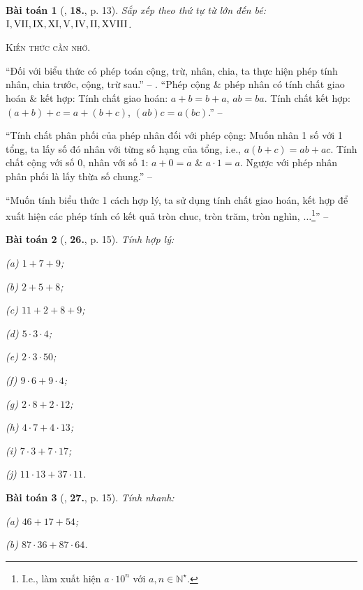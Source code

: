 \documentclass{article}
\numberwithin{equation}{section}
\newtheorem{baitoan}{Bài toán}[section]
\begin{document}
\begin{baitoan}[\cite{Trong_Toan_6_2021}, \textbf{18.}, p. 13]
	Sắp xếp theo thứ tự từ lớn đến bé: $\rm I,VII,IX,XI,V,IV,II,XVIII$.
\end{baitoan}
\noindent\textsc{Kiến thức cần nhớ.}
\begin{tcolorbox}
	``Đối với biểu thức có phép toán cộng, trừ, nhân, chia, ta thực hiện phép tính nhân, chia trước, cộng, trừ sau.'' -- \cite[p. 13]{Trong_Toan_6_2021}. ``Phép cộng \& phép nhân có tính chất giao hoán \& kết hợp: Tính chất giao hoán: $a + b = b + a$, $ab = ba$. Tính chất kết hợp: $(a + b) + c = a + (b + c)$, $(ab)c = a(bc)$.'' -- \cite[p. 14]{Trong_Toan_6_2021}
	
	``Tính chất phân phối của phép nhân đối với phép cộng: Muốn nhân 1 số với 1 tổng, ta lấy số đó nhân với từng số hạng của tổng, i.e., $a(b + c) = ab + ac$. Tính chất cộng với số $0$, nhân với số $1$: $a + 0 = a$ \& $a\cdot 1 = a$. Ngược với phép nhân phân phối là lấy thừa số chung.'' -- \cite[p. 14]{Trong_Toan_6_2021}
	
	``Muốn tính biểu thức 1 cách hợp lý, ta sử dụng tính chất giao hoán, kết hợp để xuất hiện các phép tính có kết quả tròn chuc, tròn trăm, tròn nghìn, $\ldots$\footnote{I.e., làm xuất hiện $a\cdot 10^n$ với $a,n\in\mathbb{N}^\star$.}'' -- \cite[p. 15]{Trong_Toan_6_2021}
\end{tcolorbox}

\begin{baitoan}[\cite{Trong_Toan_6_2021}, \textbf{26.}, p. 15]
	Tính hợp lý:
	\begin{enumerate*}
		\item[(a)] $1 + 7 + 9$;
		\item[(b)] $2 + 5 + 8$;
		\item[(c)] $11 + 2 + 8 + 9$;
		\item[(d)] $5\cdot 3\cdot 4$;
		\item[(e)] $2\cdot 3\cdot 50$;
		\item[(f)] $9\cdot 6 + 9\cdot 4$;
		\item[(g)] $2\cdot 8 + 2\cdot 12$;
		\item[(h)] $4\cdot 7 + 4 \cdot 13$;
		\item[(i)] $7\cdot 3 + 7\cdot 17$;
		\item[(j)] $11\cdot 13 + 37\cdot 11$.
	\end{enumerate*}
\end{baitoan}

\begin{baitoan}[\cite{Trong_Toan_6_2021}, \textbf{27.}, p. 15]
	Tính nhanh:
	\begin{enumerate*}
		\item[(a)] $46 + 17 + 54$;
		\item[(b)] $87\cdot 36 + 87\cdot 64$.
	\end{enumerate*}
\end{baitoan}
\end{document}
